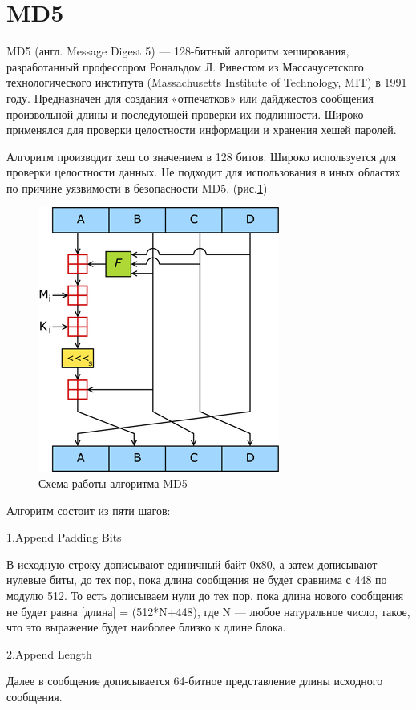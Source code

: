 \documentclass[a4paper, 12pt, oneside]{scrartcl}
\begin{document}
	\section{MD5}\label{sec:section2}
	MD5 (англ. Message Digest 5) — 128-битный алгоритм хеширования, разработанный профессором Рональдом Л. Ривестом из Массачусетского технологического института (Massachusetts Institute of Technology, MIT) в 1991 году.
	Предназначен для создания «отпечатков» или дайджестов сообщения произвольной длины и последующей проверки их подлинности.
	Широко применялся для проверки целостности информации и хранения хешей паролей.~\cite{md1}
	
	Алгоритм производит хеш со значением в 128 битов. Широко используется для проверки целостности данных.
	Не подходит для использования в иных областях по причине уязвимости в безопасности MD5. (рис.\ref{fig:key1})
	\begin{figure}[h!]
		\centering
		\includegraphics[scale=0.9]{MD5}
		\caption{Схема работы алгоритма MD5}
		\label{fig:key1}
	\end{figure}
	\par
	Алгоритм состоит из пяти шагов:\par
	1.Append Padding Bits\par
	В исходную строку дописывают единичный байт 0х80, а затем дописывают нулевые биты, до тех пор, пока длина сообщения не будет сравнима с 448 по модулю 512.
	То есть дописываем нули до тех пор, пока длина нового сообщения не будет равна [длина] = (512*N+448), где N — любое натуральное число, такое, что это выражение будет наиболее близко к длине блока.
	
	2.Append Length\par
	Далее в сообщение дописывается 64-битное представление длины исходного сообщения.
	
\end{document}
